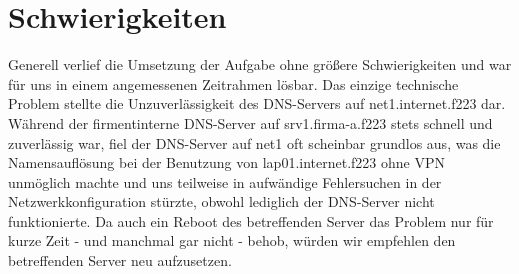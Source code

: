 \chapter{Schwierigkeiten}
Generell verlief die Umsetzung der Aufgabe ohne größere Schwierigkeiten und war für uns in einem angemessenen Zeitrahmen lösbar. Das einzige technische Problem stellte die Unzuverlässigkeit des DNS-Servers auf net1.internet.f223 dar. Während der firmentinterne DNS-Server auf srv1.firma-a.f223 stets schnell und zuverlässig war, fiel der DNS-Server auf net1 oft scheinbar grundlos aus, was die Namensauflösung bei der Benutzung von lap01.internet.f223 ohne VPN unmöglich machte und uns teilweise in aufwändige Fehlersuchen in der Netzwerkkonfiguration stürzte, obwohl lediglich der DNS-Server nicht funktionierte. Da auch ein Reboot des betreffenden Server das Problem nur für kurze Zeit - und manchmal gar nicht - behob, würden wir empfehlen den betreffenden Server neu aufzusetzen.